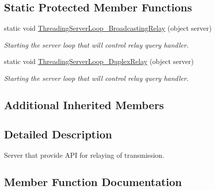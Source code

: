 \subsection*{Static Protected Member Functions}
\begin{DoxyCompactItemize}
\item 
static void \mbox{\hyperlink{class_uniform_server_1_1_standard_1_1_relay_server_a5940f8db2d25ff38ecdb7e5ab74063f9}{Threading\+Server\+Loop\+\_\+\+Broadcasting\+Relay}} (object server)
\begin{DoxyCompactList}\small\item\em Starting the server loop that will control relay query handler. \end{DoxyCompactList}\item 
static void \mbox{\hyperlink{class_uniform_server_1_1_standard_1_1_relay_server_a8612def1490dc0c8e0b4535a54a09c18}{Threading\+Server\+Loop\+\_\+\+Duplex\+Relay}} (object server)
\begin{DoxyCompactList}\small\item\em Starting the server loop that will control relay query handler. \end{DoxyCompactList}\end{DoxyCompactItemize}
\subsection*{Additional Inherited Members}


\subsection{Detailed Description}
Server that provide A\+PI for relaying of transmission. 



\subsection{Member Function Documentation}
\mbox{\label{class_uniform_server_1_1_standard_1_1_relay_server_a95fbce307be04e63d120a674f7bde0f3}} 

